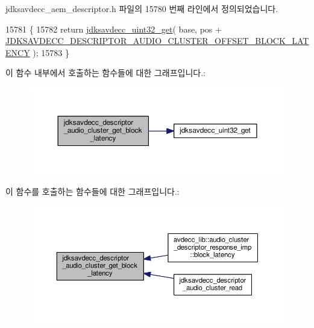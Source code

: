 jdksavdecc\+\_\+aem\+\_\+descriptor.\+h 파일의 15780 번째 라인에서 정의되었습니다.


\begin{DoxyCode}
15781 \{
15782     \textcolor{keywordflow}{return} \hyperlink{group__endian_gaefcf5bd4f368997a82f358ab89052d6b}{jdksavdecc\_uint32\_get}( base, pos + 
      \hyperlink{group__descriptor__audio__cluster_gafe4912a6994a34ed707bb8dd8aac53a6}{JDKSAVDECC\_DESCRIPTOR\_AUDIO\_CLUSTER\_OFFSET\_BLOCK\_LATENCY}
       );
15783 \}
\end{DoxyCode}


이 함수 내부에서 호출하는 함수들에 대한 그래프입니다.\+:
\nopagebreak
\begin{figure}[H]
\begin{center}
\leavevmode
\includegraphics[width=350pt]{group__descriptor__audio__cluster_ga664f971791a1b29b00c29128fe603bbb_cgraph}
\end{center}
\end{figure}




이 함수를 호출하는 함수들에 대한 그래프입니다.\+:
\nopagebreak
\begin{figure}[H]
\begin{center}
\leavevmode
\includegraphics[width=350pt]{group__descriptor__audio__cluster_ga664f971791a1b29b00c29128fe603bbb_icgraph}
\end{center}
\end{figure}


